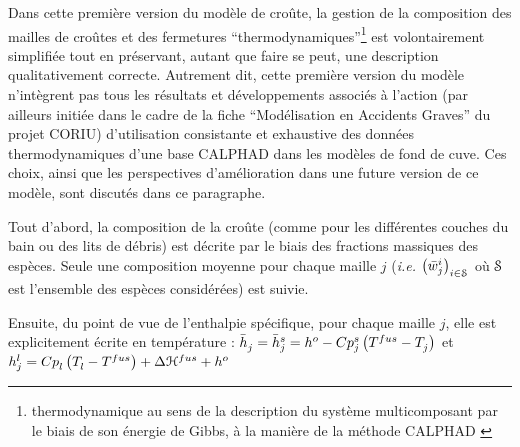 
Dans cette première version du modèle de croûte, la gestion de la composition des mailles de croûtes et des fermetures ``thermodynamiques''\footnote{thermodynamique au sens de la description du système multicomposant par le biais de son énergie de Gibbs, à la manière de la méthode CALPHAD \cite{Lukas2007}} est volontairement simplifiée tout en préservant, autant que faire se peut, une description qualitativement correcte. Autrement dit, cette première version du modèle n'intègrent pas tous les résultats et développements associés à l'action (par ailleurs initiée dans le cadre de la fiche ``Modélisation en Accidents Graves'' du projet CORIU) d'utilisation consistante et exhaustive des données thermodynamiques d'une base CALPHAD dans les modèles de fond de cuve. Ces choix, ainsi que les perspectives d'amélioration dans une future version de ce modèle, sont discutés dans ce paragraphe.

Tout d'abord, la composition de la croûte (comme pour les différentes couches du bain ou des lits de débris) est décrite par le biais des fractions massiques des espèces. Seule une composition moyenne pour chaque maille $j$  (\textit{i.e.} $\left(\avMassFraction[i]{j}\right)_{i\in \speciesSet}$ où $\speciesSet$ est l'ensemble des espèces considérées) est suivie.

Ensuite, du point de vue de l'enthalpie spécifique, pour chaque maille $j$, elle est explicitement écrite en température :
$\avMassEnthalpy{j} = \avMassEnthalpy[s]{j}=\massEnthalpy[o]{} - \heatCp[s]{j} \left(\temperature[fus]{} - \temperature{j}\right)$ et $\massEnthalpy[l]{j} = \heatCp{l} \left(\temperature{l} - \temperature[fus]{}\right) + \dEnthalpy[fus]{} + \massEnthalpy[o]{}$





\cite{Tiwari2018}
